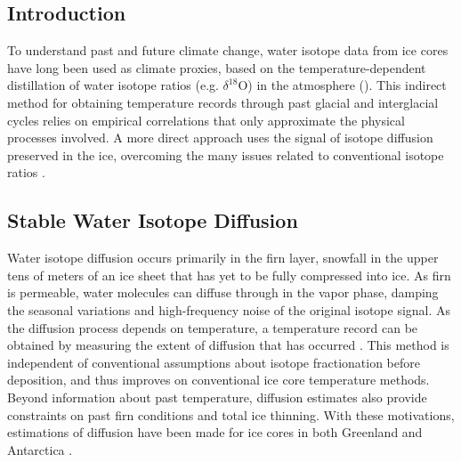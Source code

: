 \documentclass[draft, jgrga]{AGUTeX}
\begin{document}


\begin{article}

\section{Introduction}

To understand past and future climate change, water isotope data from ice cores have long been used as climate proxies, based on the temperature-dependent distillation of water isotope ratios (e.g. $\delta^{18}\mathrm{O}$) in the atmosphere (\citep{Epstein1951,Dansgaard1954,Dansgaard1964}). This indirect method for obtaining temperature records through past glacial and interglacial cycles relies on empirical correlations that only approximate the physical processes involved. A more direct approach uses the signal of isotope diffusion preserved in the ice, overcoming the many issues related to conventional
isotope ratios \citep{Johnsen2000}.

\subsection{Stable Water Isotope Diffusion}

Water isotope diffusion occurs primarily in the firn layer, snowfall in the upper tens of meters of an ice sheet that has yet to be fully compressed into ice. As firn is permeable, water molecules can diffuse through in the vapor phase, damping the seasonal variations and high-frequency noise of the original isotope signal. As the diffusion process depends on temperature, a temperature record can be obtained by measuring the extent of diffusion that has occurred \citep{Johnsen2000}. This method is independent of conventional assumptions about isotope fractionation before deposition, and thus improves on conventional ice core temperature methods. Beyond information about past temperature, diffusion estimates also provide constraints on past firn conditions and total ice thinning. With these motivations, estimations of diffusion have been made for ice cores in both Greenland and Antarctica \citep{Simonsen2011,Gkinis2014,vanderWel2015,Jones2017a}.


\end{article}
\end{document}
